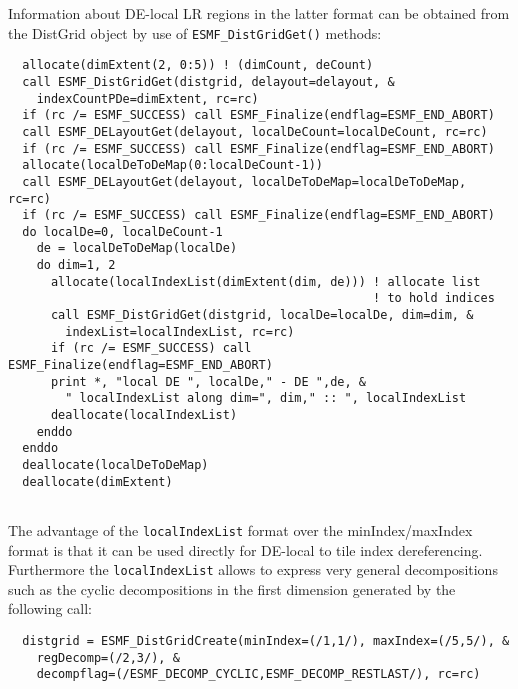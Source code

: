    Information about DE-local LR regions in the latter format can be obtained 
   from the DistGrid object by use of {\tt ESMF\_DistGridGet()} methods:
   

 \begin{verbatim}
  allocate(dimExtent(2, 0:5)) ! (dimCount, deCount)
  call ESMF_DistGridGet(distgrid, delayout=delayout, &
    indexCountPDe=dimExtent, rc=rc)
  if (rc /= ESMF_SUCCESS) call ESMF_Finalize(endflag=ESMF_END_ABORT)
  call ESMF_DELayoutGet(delayout, localDeCount=localDeCount, rc=rc)
  if (rc /= ESMF_SUCCESS) call ESMF_Finalize(endflag=ESMF_END_ABORT)
  allocate(localDeToDeMap(0:localDeCount-1))
  call ESMF_DELayoutGet(delayout, localDeToDeMap=localDeToDeMap, rc=rc)
  if (rc /= ESMF_SUCCESS) call ESMF_Finalize(endflag=ESMF_END_ABORT)
  do localDe=0, localDeCount-1
    de = localDeToDeMap(localDe)
    do dim=1, 2
      allocate(localIndexList(dimExtent(dim, de))) ! allocate list 
                                                   ! to hold indices
      call ESMF_DistGridGet(distgrid, localDe=localDe, dim=dim, &
        indexList=localIndexList, rc=rc)
      if (rc /= ESMF_SUCCESS) call ESMF_Finalize(endflag=ESMF_END_ABORT)
      print *, "local DE ", localDe," - DE ",de, &
        " localIndexList along dim=", dim," :: ", localIndexList
      deallocate(localIndexList)
    enddo
  enddo
  deallocate(localDeToDeMap)
  deallocate(dimExtent)
 
\end{verbatim}
 

   The advantage of the {\tt localIndexList} format over the minIndex/maxIndex 
   format is that it can be used directly for DE-local to tile index 
   dereferencing. Furthermore the {\tt localIndexList} allows to express very
   general decompositions such as the cyclic decompositions in the first
   dimension generated by the following call: 

 \begin{verbatim}
  distgrid = ESMF_DistGridCreate(minIndex=(/1,1/), maxIndex=(/5,5/), &
    regDecomp=(/2,3/), &
    decompflag=(/ESMF_DECOMP_CYCLIC,ESMF_DECOMP_RESTLAST/), rc=rc)
 
\end{verbatim}
 

